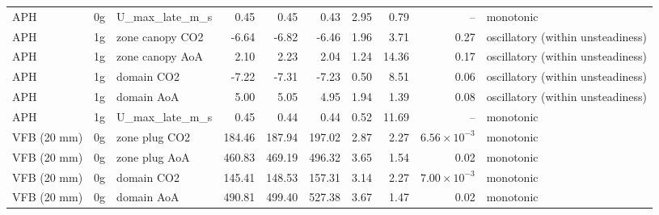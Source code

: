 \begin{table}[htbp]
\begin{adjustbox}{max width=\linewidth}
\begin{tabular}{lllrrrrrrl}
APH & 0g & U\_max\_late\_m\_s & 0.45 & 0.45 & 0.43 & 2.95 & 0.79 & -- & monotonic \\
APH & 1g & zone canopy CO2 & -6.64 & -6.82 & -6.46 & 1.96 & 3.71 & 0.27 & oscillatory (within unsteadiness) \\
APH & 1g & zone canopy AoA & 2.10 & 2.23 & 2.04 & 1.24 & 14.36 & 0.17 & oscillatory (within unsteadiness) \\
APH & 1g & domain CO2 & -7.22 & -7.31 & -7.23 & 0.50 & 8.51 & 0.06 & oscillatory (within unsteadiness) \\
APH & 1g & domain AoA & 5.00 & 5.05 & 4.95 & 1.94 & 1.39 & 0.08 & oscillatory (within unsteadiness) \\
APH & 1g & U\_max\_late\_m\_s & 0.45 & 0.44 & 0.44 & 0.52 & 11.69 & -- & monotonic \\
VFB (20 mm) & 0g & zone plug CO2 & 184.46 & 187.94 & 197.02 & 2.87 & 2.27 & $6.56\times10^{-3}$ & monotonic \\
VFB (20 mm) & 0g & zone plug AoA & 460.83 & 469.19 & 496.32 & 3.65 & 1.54 & 0.02 & monotonic \\
VFB (20 mm) & 0g & domain CO2 & 145.41 & 148.53 & 157.31 & 3.14 & 2.27 & $7.00\times10^{-3}$ & monotonic \\
VFB (20 mm) & 0g & domain AoA & 490.81 & 499.40 & 527.38 & 3.67 & 1.47 & 0.02 & monotonic \\
\bottomrule
\end{tabular}
\end{adjustbox}
\end{table}
